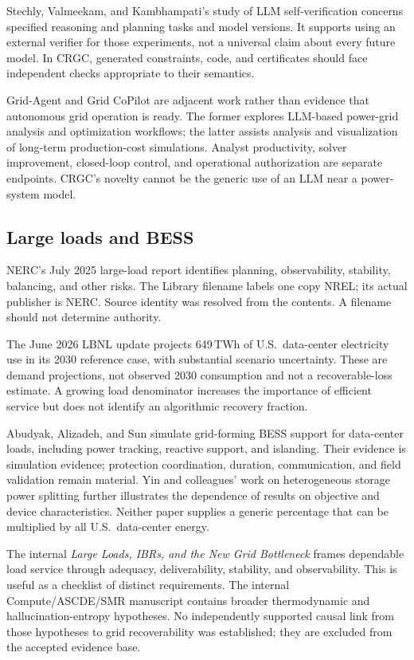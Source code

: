 \documentclass[11pt,letterpaper]{article}
\begin{document}
Stechly, Valmeekam, and Kambhampati's study of LLM self-verification concerns specified reasoning and planning tasks and model versions. It supports using an external verifier for those experiments, not a universal claim about every future model.\cite{selfverify} In CRGC, generated constraints, code, and certificates should face independent checks appropriate to their semantics.

Grid-Agent and Grid CoPilot are adjacent work rather than evidence that autonomous grid operation is ready. The former explores LLM-based power-grid analysis and optimization workflows; the latter assists analysis and visualization of long-term production-cost simulations.\cite{gridagent,gridcopilot} Analyst productivity, solver improvement, closed-loop control, and operational authorization are separate endpoints. CRGC's novelty cannot be the generic use of an LLM near a power-system model.

\subsection{Large loads and BESS}
NERC's July 2025 large-load report identifies planning, observability, stability, balancing, and other risks.\cite{nerc} The Library filename labels one copy NREL; its actual publisher is NERC. Source identity was resolved from the contents. A filename should not determine authority.

The June 2026 LBNL update projects 649\,TWh of U.S.\ data-center electricity use in its 2030 reference case, with substantial scenario uncertainty. These are demand projections, not observed 2030 consumption and not a recoverable-loss estimate.\cite{lbnl} A growing load denominator increases the importance of efficient service but does not identify an algorithmic recovery fraction.

Abudyak, Alizadeh, and Sun simulate grid-forming BESS support for data-center loads, including power tracking, reactive support, and islanding.\cite{gfm} Their evidence is simulation evidence; protection coordination, duration, communication, and field validation remain material. Yin and colleagues' work on heterogeneous storage power splitting further illustrates the dependence of results on objective and device characteristics.\cite{split} Neither paper supplies a generic percentage that can be multiplied by all U.S.\ data-center energy.

The internal \emph{Large Loads, IBRs, and the New Grid Bottleneck} frames dependable load service through adequacy, deliverability, stability, and observability. This is useful as a checklist of distinct requirements.\cite{internaldls} The internal Compute/ASCDE/SMR manuscript contains broader thermodynamic and hallucination-entropy hypotheses. No independently supported causal link from those hypotheses to grid recoverability was established; they are excluded from the accepted evidence base.\cite{internalcompute}
\end{document}

